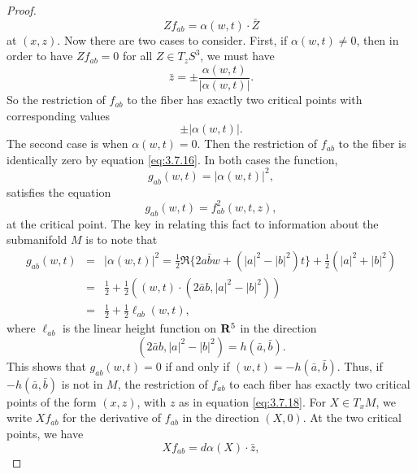 \documentclass[10pt,a4paper]{amsart}
\begin{document}
\begin{proof}
\begin{equation}
\label{eq:3.7.17}
Zf_{ab} = \alpha (w,t) \cdot \bar{Z}
\end{equation}
at $(x,z)$.  Now there are two cases to consider.  First, if $\alpha (w,t) \neq 0$, then in order to have 
$Zf_{ab} = 0$ for all $Z \in T_z S^3$, we must have
\begin{equation} 
\label{eq:3.7.18}
\bar{z} = \pm \frac{\alpha (w,t)}{|\alpha (w,t)|}.
\end{equation}
So the restriction of $f_{ab}$ to the fiber has exactly two critical points with corresponding values
\begin{equation} 
\label{eq:3.7.19}
\pm |\alpha (w,t)|.
\end{equation}
The second case is when $\alpha (w,t) = 0$.  Then the restriction of $f_{ab}$ to the fiber is identically zero
by equation \eqref{eq:3.7.16}.  In both cases the function,
\begin{displaymath}
g_{ab} (w,t) = |\alpha (w,t)|^2,
\end{displaymath}
satisfies the equation
\begin{displaymath}
g_{ab} (w,t) = f_{ab}^2 (w,t,z),
\end{displaymath}
at the critical point.  The key in relating this fact to information about the submanifold $M$ is to note that
\begin{eqnarray} 
\label{eq:3.7.20}
g_{ab} (w,t) & = & |\alpha (w,t)|^2 = \frac{1}{2} \Re \{2 a \bar{b} w + (|a|^2 - |b|^2)t\} + \frac{1}{2}(|a|^2 + |b|^2)
\nonumber \\
 & = & \frac{1}{2} + \frac{1}{2} ((w,t) \cdot (2 \bar{a} b, |a|^2 - |b|^2)) \\
& = & \frac{1}{2} + \frac{1}{2} \ell_{ab} (w,t), \nonumber
\end{eqnarray}
where $\ell_{ab}$ is the linear height function on ${\bf R}^5$ in the direction
\begin{displaymath}
(2\bar{a} b, |a|^2 - |b|^2) = h (\bar{a}, \bar{b}).
\end{displaymath}
This shows that $g_{ab} (w,t) = 0$ if and only if $(w,t) = - h(\bar{a}, \bar{b})$.  Thus, if $- h(\bar{a}, \bar{b})$
is not in $M$, the restriction of $f_{ab}$ to each fiber has exactly two critical points of the form $(x,z)$, with $z$
as in equation \eqref{eq:3.7.18}.  For $X \in T_x M$, we write $Xf_{ab}$ for the derivative of $f_{ab}$ in the direction
$(X,0)$.  At the two critical points, we have
\begin{equation} 
\label{eq:3.7.21}
Xf_{ab} = d\alpha (X) \cdot \bar{z},
\end{equation}

\end{proof}
\end{document}
